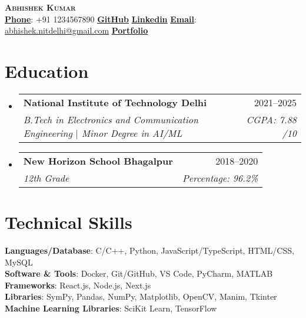 \documentclass[a4paper, 10.75pt]{article}
\makeatletter
\newcommand{\resumeSubheading}[4]{
  \vspace{-2pt}\item
    \begin{tabular*}{0.97\textwidth}[t]{l@{\extracolsep{\fill}}r}
      \textbf{#1} & #2 \\
      \textit{\small#3} & \textit{\small #4} \\
    \end{tabular*}\vspace{-8pt}
}
\newcommand{\resumeSubHeadingListStart}{\begin{itemize}[leftmargin=0.15in, label={}]}
\newcommand{\resumeSubHeadingListEnd}{\end{itemize}}
\makeatother
\begin{document}
\begin{center}
    \textbf{\Huge \scshape Abhishek Kumar} \\ \vspace{8pt}
    \small 
    \textbf{\underline{Phone}}: {+91 1234567890} \hspace{12pt} %
    \href{https://github.com/abhiphile}{\textbf{\underline{GitHub}}} \hspace{12pt} %
    \href{https://www.linkedin.com/in/abhishek-kumar-nitdelhi/}{\textbf{\underline{Linkedin}}} \hspace{12pt} %
    \textbf{\underline{Email}}: 
    \href{mailto:abhishek.nitdelhi@gmail.com}
    {\underline{abhishek.nitdelhi@gmail.com}} \hspace{12pt} 
    \href{https://abhishek-portfolio-chi.vercel.app/}{{\textbf{\underline{Portfolio}}}}
\end{center}


\section{Education}
\resumeSubHeadingListStart

\resumeSubheading
{National Institute of Technology Delhi}{2021--2025}
{B.Tech in Electronics and Communication Engineering
$|$ Minor Degree in AI/ML}{CGPA: 7.88 /10}

\resumeSubheading
{New Horizon School Bhagalpur}{2018--2020}
{12th Grade}{Percentage: 96.2\%}

\resumeSubHeadingListEnd


\section{Technical Skills}
 \begin{itemize}[leftmargin=0.15in, label={}]
    \small{\item{
    
     \textbf{Languages/Database}{: C/C++, Python, JavaScript/TypeScript, HTML/CSS, MySQL} \\
     \textbf{Software \& Tools}{: Docker, Git/GitHub, VS Code, PyCharm, MATLAB}\\
      \textbf{Frameworks}{: React.js, Node.js, Next.js} \\
      \textbf{Libraries}{: SymPy, Pandas, NumPy, Matplotlib, OpenCV, Manim, Tkinter }\\
     \textbf{Machine Learning Libraries}{: SciKit Learn, TensorFlow}
    }}
 \end{itemize}
\end{document}
